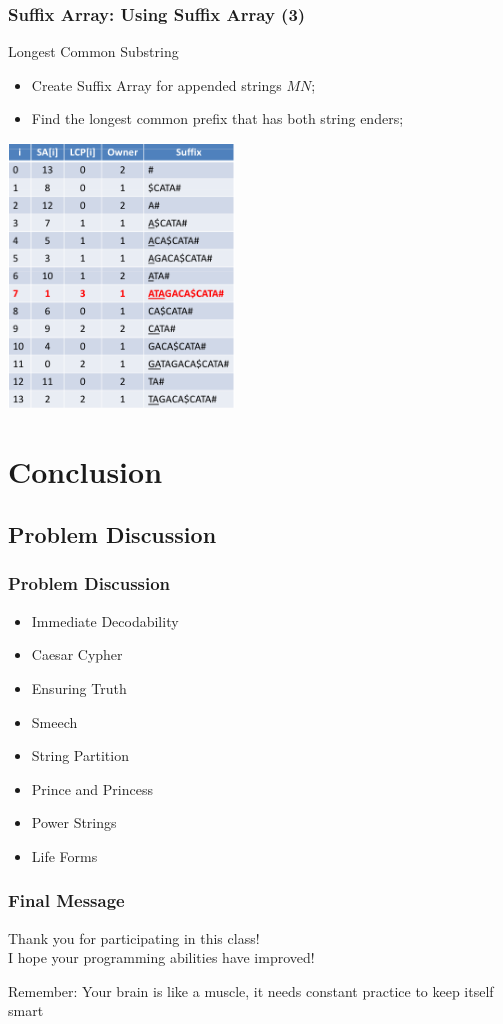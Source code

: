 \documentclass{beamer}
\begin{document}
\begin{frame}
    \frametitle{Suffix Array: Using Suffix Array (3)}
  {\smaller
    \begin{block}{Longest Common Substring}
      \begin{itemize}
      \item Create Suffix Array for appended strings $MN$;
      \item Find the longest common prefix that has both string enders;
      \end{itemize}
    \end{block}
    \begin{center}
      \includegraphics[width=0.45\textwidth]{../img/suffixarray3_halim}
    \end{center}
  }
\end{frame}

\section{Conclusion}

\subsection{Problem Discussion}
\begin{frame}
  \frametitle{Problem Discussion}
  \begin{itemize}
  \item Immediate Decodability
  \item Caesar Cypher
  \item Ensuring Truth
  \item Smeech
  \item String Partition
  \item Prince and Princess
  \item Power Strings
  \item Life Forms
  \end{itemize}
\end{frame}

\begin{frame}
  \frametitle{Final Message}
  \begin{center}
    Thank you for participating in this class!\\
    I hope your programming abilities have improved!

    \vfill

    Remember: Your brain is like a muscle, it needs constant practice to keep itself smart
  \end{center}
\end{frame}
\end{document}
